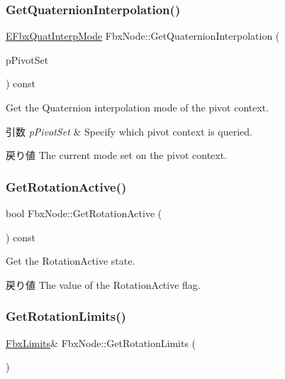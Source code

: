 \subsubsection{\texorpdfstring{Get\+Quaternion\+Interpolation()}{GetQuaternionInterpolation()}}
{\footnotesize\ttfamily \hyperlink{fbxmath_8h_a9c7a0dfb52c83256d4a92c5c6d1be72a}{E\+Fbx\+Quat\+Interp\+Mode} Fbx\+Node\+::\+Get\+Quaternion\+Interpolation (\begin{DoxyParamCaption}\item[{\hyperlink{class_fbx_node_ae62b7311ac4727654cdf1ebd5cbf7343}{E\+Pivot\+Set}}]{p\+Pivot\+Set }\end{DoxyParamCaption}) const}

Get the Quaternion interpolation mode of the pivot context. 
\begin{DoxyParams}{引数}
{\em p\+Pivot\+Set} & Specify which pivot context is queried. \\
\hline
\end{DoxyParams}
\begin{DoxyReturn}{戻り値}
The current mode set on the pivot context. 
\end{DoxyReturn}
\mbox{\label{class_fbx_node_a4060333733b1f6af34bda51806569f85}} 
\subsubsection{\texorpdfstring{Get\+Rotation\+Active()}{GetRotationActive()}}
{\footnotesize\ttfamily bool Fbx\+Node\+::\+Get\+Rotation\+Active (\begin{DoxyParamCaption}{ }\end{DoxyParamCaption}) const}

Get the Rotation\+Active state. \begin{DoxyReturn}{戻り値}
The value of the Rotation\+Active flag. 
\end{DoxyReturn}
\mbox{\label{class_fbx_node_a6dc4a0b13915fe3963f5e80f79d89341}} 
\subsubsection{\texorpdfstring{Get\+Rotation\+Limits()}{GetRotationLimits()}}
{\footnotesize\ttfamily \hyperlink{class_fbx_limits}{Fbx\+Limits}\& Fbx\+Node\+::\+Get\+Rotation\+Limits (\begin{DoxyParamCaption}{ }\end{DoxyParamCaption})}

